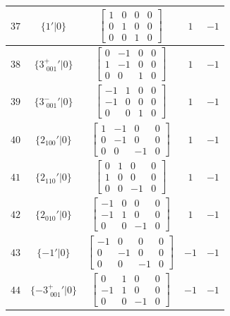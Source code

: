 \documentclass[fleqn,8pt]{jsarticle}
\begin{document}
\begin{longtable}{ccccc}
$ 37 $ & $ \{1{}'|0\} $ & $ \begin{bmatrix} 1 & 0 & 0 & 0 \\ 0 & 1 & 0 & 0 \\ 0 & 0 & 1 & 0 \end{bmatrix} $ & $ 1 $ & $ -1 $ \\ \hline
$ 38 $ & $ \{3^{+}_{\,\,001}{}'|0\} $ & $ \begin{bmatrix} 0 & -1 & 0 & 0 \\ 1 & -1 & 0 & 0 \\ 0 & 0 & 1 & 0 \end{bmatrix} $ & $ 1 $ & $ -1 $ \\ \hline
$ 39 $ & $ \{3^{-}_{\,\,001}{}'|0\} $ & $ \begin{bmatrix} -1 & 1 & 0 & 0 \\ -1 & 0 & 0 & 0 \\ 0 & 0 & 1 & 0 \end{bmatrix} $ & $ 1 $ & $ -1 $ \\ \hline
$ 40 $ & $ \{2{}_{100}{}'|0\} $ & $ \begin{bmatrix} 1 & -1 & 0 & 0 \\ 0 & -1 & 0 & 0 \\ 0 & 0 & -1 & 0 \end{bmatrix} $ & $ 1 $ & $ -1 $ \\ \hline
$ 41 $ & $ \{2{}_{110}{}'|0\} $ & $ \begin{bmatrix} 0 & 1 & 0 & 0 \\ 1 & 0 & 0 & 0 \\ 0 & 0 & -1 & 0 \end{bmatrix} $ & $ 1 $ & $ -1 $ \\ \hline
$ 42 $ & $ \{2{}_{010}{}'|0\} $ & $ \begin{bmatrix} -1 & 0 & 0 & 0 \\ -1 & 1 & 0 & 0 \\ 0 & 0 & -1 & 0 \end{bmatrix} $ & $ 1 $ & $ -1 $ \\ \hline
$ 43 $ & $ \{-1{}'|0\} $ & $ \begin{bmatrix} -1 & 0 & 0 & 0 \\ 0 & -1 & 0 & 0 \\ 0 & 0 & -1 & 0 \end{bmatrix} $ & $ -1 $ & $ -1 $ \\ \hline
$ 44 $ & $ \{-3^{+}_{\,\,001}{}'|0\} $ & $ \begin{bmatrix} 0 & 1 & 0 & 0 \\ -1 & 1 & 0 & 0 \\ 0 & 0 & -1 & 0 \end{bmatrix} $ & $ -1 $ & $ -1 $ \\ \hline

\end{longtable}
\end{document}
